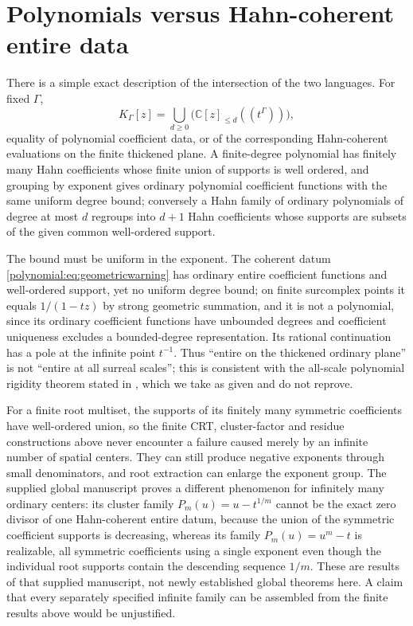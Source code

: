 \documentclass[11pt,letterpaper]{article}
\numberwithin{equation}{section}
\theoremstyle{definition}
\theoremstyle{remark}\newtheorem{remark}[theorem]{Remark}
\newcommand{\C}{\mathbb C}
\begin{document}
\section{Polynomials versus Hahn-coherent entire data}
\label{polynomial:subsec:uniformdegree}
There is a simple exact description of the intersection of the two languages.
For fixed $\Gamma$,
\begin{equation}\label{polynomial:eq:uniformdegree}
 K_\Gamma[z]=\bigcup_{d\ge0}\bigl(\C[z]_{\le d}((t^\Gamma))\bigr),
\end{equation}
equality of polynomial coefficient data, or of the corresponding
Hahn-coherent evaluations on the finite thickened plane. A finite-degree
polynomial has finitely many Hahn coefficients whose finite union of supports
is well ordered, and grouping by exponent gives ordinary polynomial
coefficient functions with the same uniform degree bound; conversely a Hahn
family of ordinary polynomials of degree at most $d$ regroups into $d+1$ Hahn
coefficients whose supports are subsets of the given common well-ordered
support.

The bound must be uniform in the exponent. The coherent datum
\eqref{polynomial:eq:geometricwarning} has ordinary entire coefficient
functions and well-ordered support, yet no uniform degree bound; on finite
surcomplex points it equals $1/(1-tz)$ by strong geometric summation, and it
is not a polynomial, since its ordinary coefficient functions have unbounded
degrees and coefficient uniqueness excludes a bounded-degree representation.
Its rational continuation has a pole at the infinite point $t^{-1}$. Thus
``entire on the thickened ordinary plane'' is not ``entire at all surreal
scales''; this is consistent with the all-scale polynomial rigidity theorem
stated in \cite{polynomial:SourceAnalysis}, which we take as given and do not
reprove.

For a finite root multiset, the supports of its finitely many symmetric
coefficients have well-ordered union, so the finite CRT, cluster-factor and
residue constructions above never encounter a failure caused merely by an
infinite number of spatial centers. They can still produce negative exponents
through small denominators, and root extraction can enlarge the exponent
group. The supplied global manuscript \cite{polynomial:SourceGlobal} proves a
different phenomenon for infinitely many ordinary centers: its cluster family
$P_m(u)=u-t^{1/m}$ cannot be the exact zero divisor of one Hahn-coherent
entire datum, because the union of the symmetric coefficient supports is
decreasing, whereas its family $P_m(u)=u^m-t$ is realizable, all symmetric
coefficients using a single exponent even though the individual root supports
contain the descending sequence $1/m$. These are results of that supplied
manuscript, not newly established global theorems here. A claim that every
separately specified infinite family can be assembled from the finite results
above would be unjustified.
\end{document}
